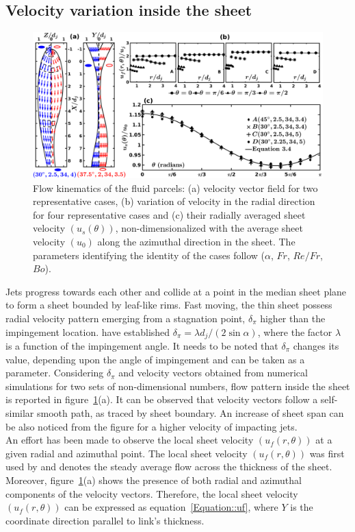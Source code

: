 \subsection{Velocity variation inside the sheet}
\begin{figure}
	\centering
	\includegraphics[width=\linewidth]{chapters/Figure5}
	\caption{Flow kinematics of the fluid parcels: (a) velocity vector field for two representative cases, (b) variation of velocity in the radial direction for four representative cases and (c) their radially averaged sheet velocity $\left(u_s(\theta)\right)$, non-dimensionalized with the average sheet velocity $\left(u_0\right)$ along the azimuthal direction in the sheet. The parameters identifying the identity of the cases follow ($\alpha$, $Fr$, $Re/Fr$, $Bo$).}
	\label{Figure::velocityVectors}
\end{figure}
Jets progress towards each other and collide at a point in the median sheet plane to form a sheet bounded by leaf-like rims. Fast moving, the thin sheet possess radial velocity pattern emerging from a stagnation point, $\delta_\pi$ higher than the impingement location. \cite{inamura2014effect} have established $\delta_\pi = \lambda d_j/(2\sin\alpha)$, where the factor $\lambda$ is a function of the impingement angle. It needs to be noted that $\delta_\pi$ changes its value, depending upon the angle of impingement and can be taken as a parameter. Considering $\delta_\pi$ and velocity vectors obtained from numerical simulations for two sets of non-dimensional numbers, flow pattern inside the sheet is reported in figure~\ref{Figure::velocityVectors}(a). It can be observed that velocity vectors follow a self-similar smooth path, as traced by sheet boundary. An increase of sheet span can be also noticed from the figure for a higher velocity of impacting jets.\\
An effort has been made to observe the local sheet velocity $\left(u_f(r,\theta)\right)$ at a given radial and azimuthal point. The local sheet velocity $\left(u_f(r,\theta)\right)$ was first used by \cite{choo2002velocity} and denotes the steady average flow across the thickness of the sheet. Moreover, figure~\ref{Figure::velocityVectors}(a) shows the presence of both radial and azimuthal components of the velocity vectors. Therefore, the local sheet velocity $\left(u_f(r,\theta)\right)$ can be expressed as equation~\ref{Equation::uf}, where $Y$ is the coordinate direction parallel to link's thickness.

